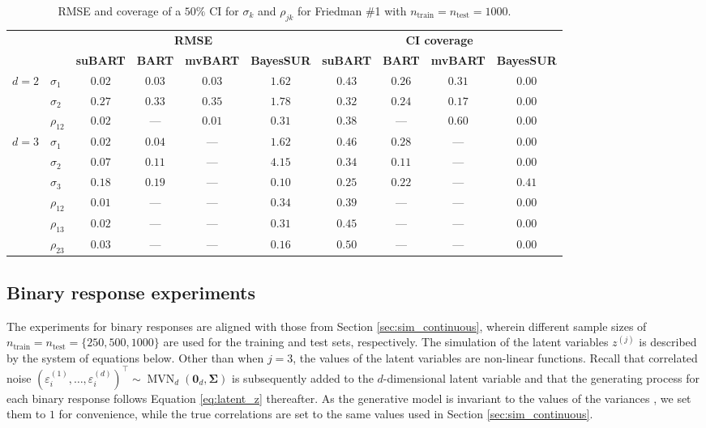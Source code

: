 \documentclass[aoas,preprint]{imsart}
\theoremstyle{plain}
\theoremstyle{definition}
\theoremstyle{remark}
\begin{document}
\begin{table}[H] 
\small
\centering
\caption{RMSE and coverage of a $50\%$ CI for $\sigma_k$ and ${\rho}_{jk}$  for Friedman \#1 with $n_{\operatorname{train}} = n_{\operatorname{test}} = 1000$.}
\setlength{\tabcolsep}{3.5pt}
\label{tab:sim_corr_fried_one_combined_1000}
\begin{tabular}{llcccccccc}
\hline
\small
&& \multicolumn{4}{c}{\textbf{RMSE}} & \multicolumn{4}{c}{\textbf{CI coverage}} \\
&& \textbf{suBART} & \textbf{BART} & \textbf{mvBART} & \textbf{BayesSUR} & \textbf{suBART} & \textbf{BART} & \textbf{mvBART} & \textbf{BayesSUR} \\
\hline
\multirow{3}{*}{$d=2$} & {$\sigma_1$} & $0.02$ & $0.03$ & $0.03$ & $1.62$ & $0.43$ & $0.26$ & $0.31$ & $0.00$ \\
&{$\sigma_2$} & $0.27$ & $0.33$ & $0.35$ & $1.78$ & $0.32$ & $0.24$ & $0.17$ & $0.00$ \\
&{$\rho_{12}$} & $0.02$ & --- & $0.01$ & $0.31$ & $0.38$ & --- & $0.60$ & $0.00$ \\ 
\hline
\multirow{6}{*}{$d=3$} & {$\sigma_1$} & $0.02$ & $0.04$ & --- & $1.62$ & $0.46$ & $0.28$ & --- & $0.00$ \\
&{$\sigma_2$} & $0.07$ & $0.11$ & --- & $4.15$ & $0.34$ & $0.11$ & --- & $0.00$ \\
&{$\sigma_3$} & $0.18$ & $0.19$ & --- & $0.10$ & $0.25$ & $0.22$ & --- & $0.41$ \\
&{$\rho_{12}$} & $0.01$ & --- & --- & $0.34$ & $0.39$ & --- & --- & $0.00$ \\ 
&{$\rho_{13}$} & $0.02$ & --- & --- & $0.31$ & $0.45$ & --- & --- & $0.00$ \\
&{$\rho_{23}$} & $0.03$ & --- & --- & $0.16$ & $0.50$ & --- & --- & $0.00$ \\ 
\end{tabular}
\end{table}%

\subsection{Binary response experiments}\label{sec:sim_binary}

The experiments for binary responses are aligned with those from Section \ref{sec:sim_continuous}, wherein different sample sizes of $ n_{\operatorname{train}} = n_{\operatorname{test}} = \{250, 500, 1000
\}$ are used for the training and test sets, respectively. The simulation of the latent variables $z^{(j)}$ is described by the system of equations below. Other than when $j=3$, the values of the latent variables are non-linear functions. Recall that correlated noise $(\varepsilon_i^{(1)}, \ldots, \varepsilon_i^{(d)})^\top \sim \operatorname{MVN}_{d}(\mathbf{0}_d, \boldsymbol{\Sigma})$ is subsequently added to the $d$-dimensional latent variable and that the generating process for each binary response follows Equation \eqref{eq:latent_z} thereafter. As the generative model is invariant to the values of the variances \citep{chib1998analysis}, we set them to $1$ for convenience, while the true correlations are set to the same values used in Section \ref{sec:sim_continuous}.\smallskip
\end{document}
